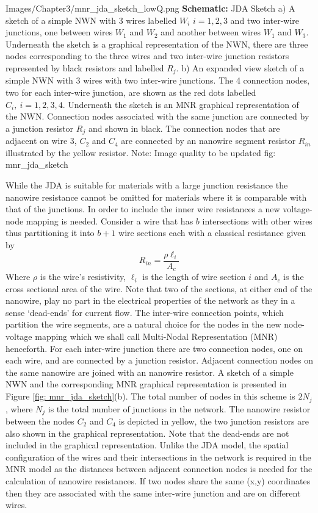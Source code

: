 {Images/Chapter3/mnr_jda_sketch_lowQ.png}
{\textbf{Schematic:} JDA Sketch}
{ a) A sketch of a simple NWN with 3 wires labelled $W_i$ $i = 1,2,3$ and two inter-wire junctions, one between wires $W_1$ and $W_2$ and another between wires $W_1$ and $W_3$. Underneath the sketch is a graphical representation of the NWN, there are three nodes corresponding to the three wires and two inter-wire junction resistors represented by black resistors and labelled $R_j$. b) An expanded view sketch of a simple NWN with 3 wires with two inter-wire junctions. The 4 connection nodes, two for each inter-wire junction, are shown as the red dots labelled $C_i, ~ i=1,2,3,4$. Underneath the sketch is an MNR graphical representation of the NWN. Connection nodes associated with the same junction are connected by a junction resistor $R_j$ and shown in black. The connection nodes that are adjacent on wire 3, $C_2$ and $C_4$ are connected by an nanowire segment resistor $R_{in}$ illustrated by the yellow resistor. Note: Image quality to be updated}
{fig: mnr_jda_sketch}


While the JDA is suitable for materials with a large junction resistance the nanowire resistance cannot be omitted for materials where it is comparable with that of the junctions. In order to include the inner wire resistances a new voltage-node mapping is needed. Consider a wire that has $b$ intersections with other wires thus partitioning it into $b+1$ wire sections each with a classical resistance given by 
\begin{equation}
R_{in} = \frac{\rho \ell_i}{A_c}
\end{equation}
Where $\rho$ is the wire's resistivity, $\ell_i$ is the length of wire section $i$ and $A_c$ is the cross sectional area of the wire. Note that two of the sections, at either end of the nanowire, play no part in the electrical properties of the network as they in a sense `dead-ends' for current flow\cite{ocallaco2016}. The inter-wire connection points, which partition the wire segments, are a natural choice for the nodes in the new node-voltage mapping which we shall call Multi-Nodal Representation (MNR) henceforth. For each inter-wire junction there are two connection nodes, one on each wire, and are connected by a junction resistor. Adjacent connection nodes on the same nanowire are joined with an nanowire resistor. A sketch of a simple NWN and the corresponding MNR graphical representation is presented in Figure \ref{fig: mnr_jda_sketch}(b). The total number of nodes in this scheme is $2 N_j$, where $N_j$ is the total number of junctions in the network. The nanowire resistor between the nodes $C_2$ and $C_4$ is depicted in yellow, the two junction resistors are also shown in the graphical representation. Note that the dead-ends are not included in the graphical representation. Unlike the JDA model, the spatial configuration of the wires and their intersections in the network is required in the MNR model as the distances between adjacent connection nodes is needed for the calculation of nanowire resistances. If two nodes share the same (x,y) coordinates then they are associated with the same inter-wire junction and are on different wires. 

